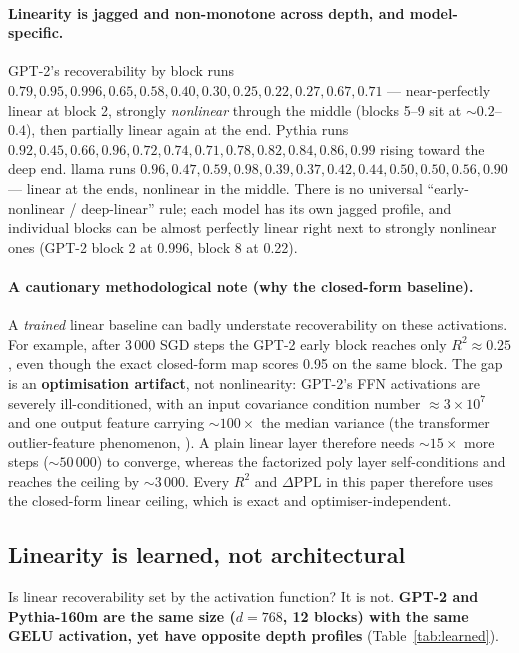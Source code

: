 \documentclass{article}
\newcommand{\dppl}{\Delta\mathrm{PPL}}
\begin{document}
\paragraph{Linearity is jagged and non-monotone across depth, and model-specific.} GPT-2's
recoverability by block runs $0.79, 0.95, \mathbf{0.996}, 0.65, 0.58, 0.40, 0.30,
\mathbf{0.25}, 0.22, 0.27, 0.67, 0.71$ --- near-perfectly linear at block 2, strongly
\emph{nonlinear} through the middle (blocks 5--9 sit at ${\sim}0.2$--$0.4$), then partially
linear again at the end. Pythia runs $0.92, 0.45, 0.66, \mathbf{0.96}, 0.72, 0.74, 0.71,
0.78, 0.82, 0.84, 0.86, \mathbf{0.99}$ rising toward the deep end. llama runs $0.96, 0.47,
0.59, \mathbf{0.98}, 0.39, 0.37, 0.42, 0.44, 0.50, 0.50, 0.56, 0.90$ --- linear at the ends,
nonlinear in the middle. There is no universal ``early-nonlinear / deep-linear'' rule; each
model has its own jagged profile, and individual blocks can be almost perfectly linear right
next to strongly nonlinear ones (GPT-2 block 2 at 0.996, block 8 at 0.22).

\paragraph{A cautionary methodological note (why the closed-form baseline).} A \emph{trained}
linear baseline can badly understate recoverability on these activations. For example, after
3\,000 SGD steps the GPT-2 early block reaches only $R^2 \approx 0.25$, even though the exact
closed-form map scores 0.95 on the same block. The gap is an \textbf{optimisation artifact},
not nonlinearity: GPT-2's FFN activations are severely ill-conditioned, with an input
covariance condition number $\approx 3\times10^7$ and one output feature carrying
${\sim}100\times$ the median variance (the transformer outlier-feature phenomenon,
\citealp{dettmers2022llmint8}). A plain linear layer therefore needs ${\sim}15\times$ more steps
(${\sim}50\,000$) to converge, whereas the factorized poly layer self-conditions and reaches the
ceiling by ${\sim}3\,000$. Every $R^2$ and $\dppl$ in this paper therefore uses the closed-form
linear ceiling, which is exact and optimiser-independent.

\subsection{Linearity is learned, not architectural}
\label{sec:learned}

Is linear recoverability set by the activation function? It is not. \textbf{GPT-2 and
Pythia-160m are the same size ($d = 768$, 12 blocks) with the same GELU activation, yet have
opposite depth profiles} (Table~\ref{tab:learned}).
\end{document}
